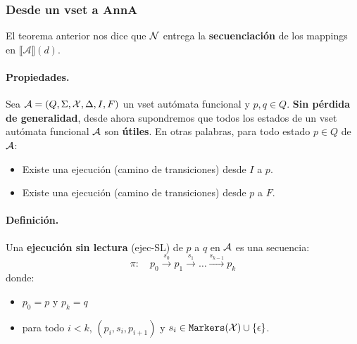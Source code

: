 \newpage


\subsubsection{Desde un vset a AnnA}


El teorema anterior nos dice que $\mathcal{N}$ entrega la \textbf{secuenciación} de los mappings en $\llbracket \mathcal{A} \rrbracket(d)$.

\paragraph{Propiedades.} Sea $\mathcal{A} = (Q, \Sigma, \mathcal{X}, \Delta, I, F)$ un vset autómata funcional y $p,q \in Q$. \textbf{Sin pérdida de generalidad}, desde ahora supondremos que todos los estados de un vset autómata funcional $\mathcal{A}$ son \textbf{útiles}. En otras palabras, para todo estado $p \in Q$ de $\mathcal{A}$:
\begin{itemize}
    \item Existe una ejecución (camino de transiciones) desde $I$ a $p$.
    \item Existe una ejecución (camino de transiciones) desde $p$ a $F$.
\end{itemize}

\paragraph{Definición.} Una \textbf{ejecución sin lectura} (ejec-SL) de $p$ a $q$ en $\mathcal{A}$ es una secuencia:
$$
    \pi: \quad p_0 \stackrel{s_0}{\rightarrow} p_1 \stackrel{s_1}{\rightarrow} \ldots \stackrel{s_{k-1}}{\rightarrow} p_k
$$
donde:
\begin{itemize}
    \item $p_0 = p$ y $p_k = q$
    \item para todo $i < k$, $(p_i, s_i, p_{i+1})$ y $s_i \in \texttt{Markers}(\mathcal{X}) \cup \{\epsilon\}$.
\end{itemize}

